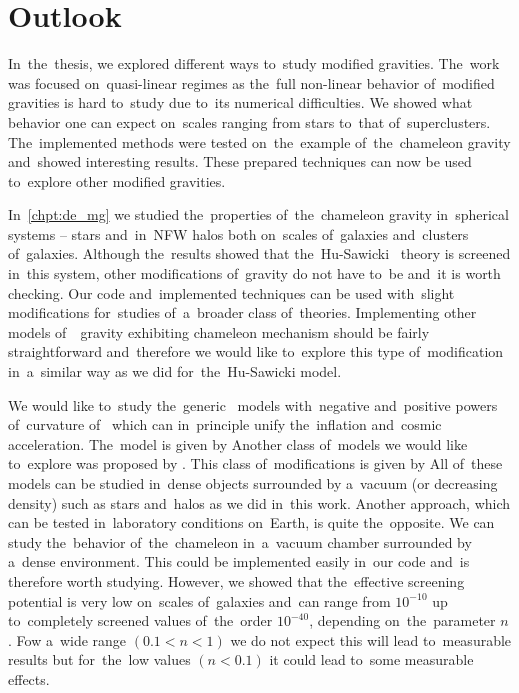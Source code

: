 \chapter{Outlook}
\label{chpt:outlook}
In~the~thesis, we explored different ways to~study modified gravities. The~work was focused on~quasi-linear regimes as the~full non-linear behavior of~modified gravities is hard to~study due to~its numerical difficulties. We showed what behavior one can expect on~scales ranging from stars to~that of~superclusters. The~implemented methods were tested on~the~example of~the~chameleon gravity and~showed interesting results. These prepared techniques can now be used to~explore other modified gravities.

In~\autoref{chpt:de_mg} we studied the~properties of~the~chameleon gravity in~spherical systems -- stars and~in~NFW halos both on~scales of~galaxies and~clusters of~galaxies. Although the~results showed that the~Hu-Sawicki \fR\ theory is screened in~this system, other modifications of~gravity do not have to~be and~it is worth checking. Our code and~implemented techniques can be used with~slight modifications for~studies of~a~broader class of~theories. Implementing other models of~\fR\ gravity exhibiting chameleon mechanism should be fairly straightforward and~therefore we would like to~explore this type of~modification in~a~similar way as we did for~the~Hu-Sawicki model.

We would like to~study the~generic \fR\ models with~negative and~positive powers of~curvature of~\textcite{2003PhRvD..68l3512N} which can in~principle unify the~inflation and~cosmic acceleration. The~model is given by
Another class of~models we would like to~explore was proposed by \textcite{2007JETPL..86..157S}. This class of~modifications is given by
All of~these models can be studied in~dense objects surrounded by a~vacuum (or decreasing density) such as stars and~halos as we did in~this work. Another approach, which can be tested in~laboratory conditions on~Earth, is quite the~opposite. We can study the~behavior of~the~chameleon in~a~vacuum chamber surrounded by a~dense environment. This could be implemented easily in~our code and~is therefore worth studying. However, we showed that the~effective screening potential is very low on~scales of~galaxies and~can range from $10^{-10}$ up to~completely screened values of~the~order $10^{-40}$, depending on~the~parameter $n$. Fow a~wide range $(0.1 < n < 1)$ we do not expect this will lead to~measurable results but for~the~low values $(n < 0.1)$ it could lead to~some measurable effects.

